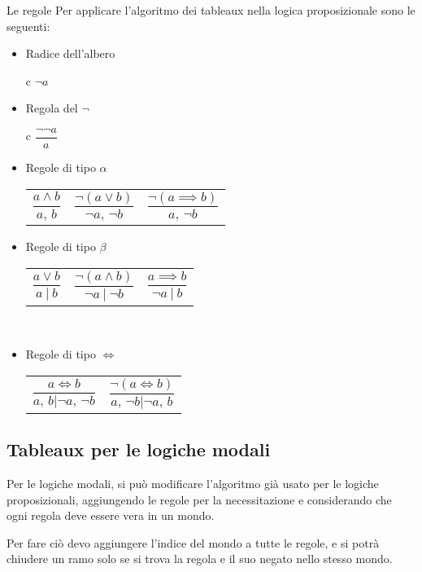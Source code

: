 Le regole Per applicare l'algoritmo dei tableaux nella logica proposizionale
sono le seguenti:
\begin{itemize}
\item Radice dell'albero\\
\def\arraystretch{2} 
\tabcolsep=10.8mm  \begin{tabular}{{c}} $\neg a$ \end{tabular}
\item Regola del $\neg$\\
\tabcolsep=10.8mm  \begin{tabular}{{c}} $\dfrac{\neg\neg a}{a}$
\end{tabular}
\item Regole di tipo $\alpha$\\
\tabcolsep=10.8mm  \begin{tabular}{*3{c}} $\dfrac{a\wedge b}{a,\, b}$&$\dfrac{\neg(a\vee b)}{\neg a,\,\neg b}$&$\dfrac{\neg(a\implies b)}{a,\,\neg b}$\end{tabular}
\item Regole di tipo $\beta$\\
  \begin{tabular}{*3{c}} $\dfrac{a\vee b}{a\ |\ b}$&$\dfrac{\neg(a\wedge b)}{\neg a\ |\ \neg b}$&$\dfrac{a\implies b}{\neg a\ |\ b}$\end{tabular}\\

\item Regole di tipo $\iff$\\
 \begin{tabular}{*2{c}} $\dfrac{a\iff b}{a,\, b|\neg a,\,\neg b}$&$\dfrac{\neg(a\iff b)}{a,\,\neg b|\neg a,\, b}$\end{tabular}
\end{itemize}

\subsection{Tableaux per le logiche modali}

Per le logiche modali, si può modificare l'algoritmo già usato per
le logiche proposizionali, aggiungendo le regole per la necessitazione
e considerando che ogni regola deve essere vera in un mondo.

Per fare ciò devo aggiungere l'indice del mondo a tutte le regole,
e si potrà chiudere un ramo solo se si trova la regola e il suo negato
nello stesso mondo.

